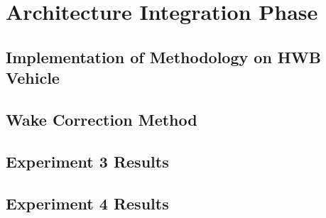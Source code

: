 \chapter{Architecture Integration Phase}

\section{Implementation of Methodology on HWB Vehicle}
\section{Wake Correction Method}
\section{Experiment 3 Results}
\section{Experiment 4 Results}